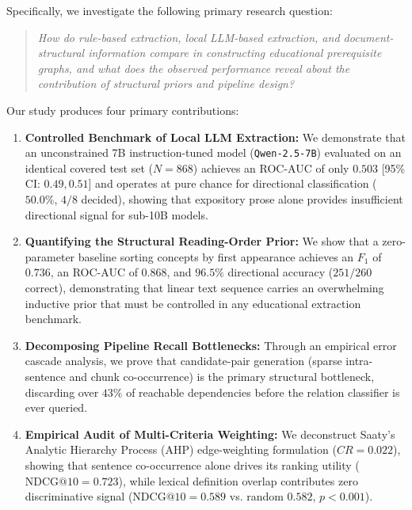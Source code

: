 Specifically, we investigate the following primary research question:
\begin{quote}
\textit{How do rule-based extraction, local LLM-based extraction, and document-structural information compare in constructing educational prerequisite graphs, and what does the observed performance reveal about the contribution of structural priors and pipeline design?}
\end{quote}

Our study produces four primary contributions:
\begin{enumerate}[leftmargin=*]
    \item \textbf{Controlled Benchmark of Local LLM Extraction:} We demonstrate that an unconstrained 7B instruction-tuned model (\texttt{Qwen-2.5-7B}) evaluated on an identical covered test set ($N=868$) achieves an ROC-AUC of only $0.503$ [95\% CI: $0.49, 0.51$] and operates at pure chance for directional classification ($50.0\%$, $4/8$ decided), showing that expository prose alone provides insufficient directional signal for sub-10B models.
    \item \textbf{Quantifying the Structural Reading-Order Prior:} We show that a zero-parameter baseline sorting concepts by first appearance achieves an $F_1$ of $0.736$, an ROC-AUC of $0.868$, and $96.5\%$ directional accuracy ($251/260$ correct), demonstrating that linear text sequence carries an overwhelming inductive prior that must be controlled in any educational extraction benchmark.
    \item \textbf{Decomposing Pipeline Recall Bottlenecks:} Through an empirical error cascade analysis, we prove that candidate-pair generation (sparse intra-sentence and chunk co-occurrence) is the primary structural bottleneck, discarding over $43\%$ of reachable dependencies before the relation classifier is ever queried.
    \item \textbf{Empirical Audit of Multi-Criteria Weighting:} We deconstruct Saaty's Analytic Hierarchy Process (AHP) edge-weighting formulation ($CR=0.022$), showing that sentence co-occurrence alone drives its ranking utility ($\text{NDCG@10} = 0.723$), while lexical definition overlap contributes zero discriminative signal ($\text{NDCG@10} = 0.589$ vs. random $0.582$, $p < 0.001$).
\end{enumerate}
